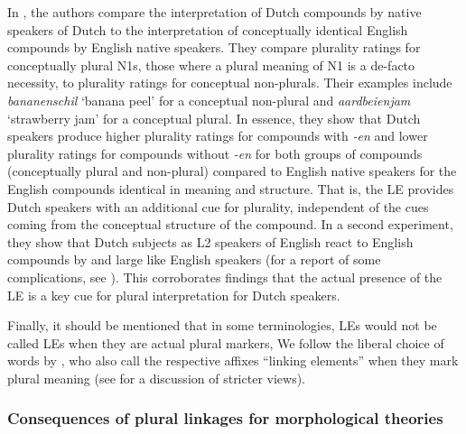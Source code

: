 In \textcite{BangaEa2013b}, the authors compare the interpretation of Dutch compounds by native speakers of Dutch to the interpretation of conceptually identical English compounds by English native speakers.
They compare plurality ratings for conceptually plural N1s, \ie those where a plural meaning of N1 is a de-facto necessity, to plurality ratings for conceptual non-plurals.
Their examples include \textit{bananenschil} `banana peel' for a conceptual non-plural and \textit{aardbeienjam} `strawberry jam' for a conceptual plural.
In essence, they show that Dutch speakers produce higher plurality ratings for compounds with \textit{-en} and lower plurality ratings for compounds without \textit{-en} for both groups of compounds (conceptually plural and non-plural) compared to English native speakers for the English compounds identical in meaning and structure.
That is, the LE provides Dutch speakers with an additional cue for plurality, independent of the cues coming from the conceptual structure of the compound.
In a second experiment, they show that Dutch subjects as L2 speakers of English react to English compounds by and large like English speakers (for a report of some complications, see \citealt[211]{BangaEa2013b}).
This corroborates findings that the actual presence of the LE is a key cue for plural interpretation for Dutch speakers.

Finally, it should be mentioned that in some terminologies, LEs would not be called LEs when they are actual plural markers,
We follow the liberal choice of words by \textcite{BangaEa2013b}, who also call the respective affixes ``linking elements'' when they mark plural meaning (see \citealt[196]{BangaEa2013b} for a discussion of stricter views).


\subsubsection{Consequences of plural linkages for morphological theories}
\label{sec:consequencesofplurallinkagesformorphologicaltheories}

